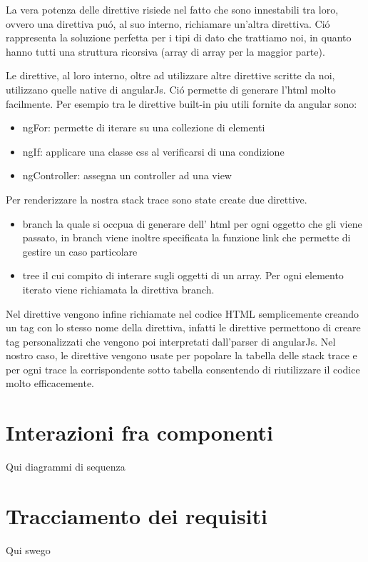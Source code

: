 La vera potenza delle direttive risiede nel fatto che sono innestabili tra loro,
ovvero una direttiva puó, al suo interno, richiamare un'altra direttiva. Ció
rappresenta la soluzione perfetta per i tipi di dato che trattiamo noi, in quanto
hanno tutti una struttura ricorsiva (array di array per la maggior parte).

Le direttive, al loro interno, oltre ad utilizzare altre direttive scritte da noi,
utilizzano quelle native di angularJs. Ció permette di generare l'html molto
facilmente. Per esempio tra le direttive built-in piu utili fornite da angular sono:
\begin{itemize}
	\item ngFor: permette di iterare su una collezione di elementi
	\item ngIf: applicare una classe css al verificarsi di una condizione
	\item ngController: assegna un controller ad una view
\end{itemize}

Per renderizzare la nostra stack trace sono state create due direttive.
\begin{itemize}
	\item branch la quale si occpua di generare dell' html per ogni oggetto che gli viene passato,
  		in branch viene inoltre specificata la funzione link che permette di gestire un caso particolare
 	\item tree il cui compito di interare sugli oggetti di un array. Per ogni elemento iterato viene richiamata
  		la direttiva branch.
\end{itemize}

Nel direttive vengono infine richiamate nel codice HTML semplicemente creando un
tag con lo stesso nome della direttiva, infatti le direttive permettono di creare
tag personalizzati che vengono poi interpretati dall'parser di angularJs.
Nel nostro caso, le direttive vengono usate per popolare la tabella delle stack trace
e per ogni trace la corrispondente sotto tabella consentendo di riutilizzare il codice
molto efficacemente.



\section{Interazioni fra componenti}
\label{sec:Interazioni}
Qui diagrammi di sequenza

\section{Tracciamento dei requisiti}
\label{sec:Tracciamento}
Qui swego 
